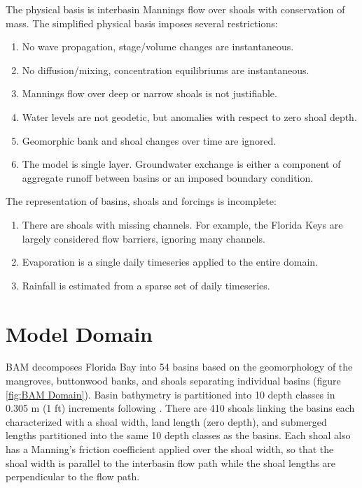 The physical basis is interbasin Mannings flow over shoals with conservation of mass.  The simplified physical basis imposes several restrictions:

\begin{enumerate}
  \itemsep-8pt
  \item No wave propagation, stage/volume changes are instantaneous.
  \item No diffusion/mixing, concentration equilibriums are instantaneous.
  \item Mannings flow over deep or narrow shoals is not justifiable.
  \item Water levels are not geodetic, but anomalies with respect to zero shoal depth. 
  \item Geomorphic bank and shoal changes over time are ignored.
  \item The model is single layer.  Groundwater exchange is either a component of aggregate runoff between basins or an imposed boundary condition.
\end{enumerate}

\vspace{12pt}
\noindent The representation of basins, shoals and forcings is incomplete:

\begin{enumerate}
  \itemsep-8pt
  \item There are shoals with missing channels. For example, the Florida Keys are largely considered flow barriers, ignoring many channels.
  \item Evaporation is a single daily timeseries applied to the entire domain.
  \item Rainfall is estimated from a sparse set of daily timeseries.
\end{enumerate}


\clearpage 
\section{Model Domain}
\label{sec:Model Domain}
BAM decomposes Florida Bay into 54 basins based on the geomorphology of the mangroves, buttonwood banks, and shoals separating individual basins (figure \ref{fig:BAM Domain}).  Basin bathymetry is partitioned into 10 depth classes in 0.305 m (1 ft) increments following \citet{Cosby2010}.  There are 410 shoals linking the basins each characterized with a shoal width, land length (zero depth), and submerged lengths partitioned into the same 10 depth classes as the basins. Each shoal also has a Manning's friction coefficient applied over the shoal width, so that the shoal width is parallel to the interbasin flow path while the shoal lengths are perpendicular to the flow path. 

